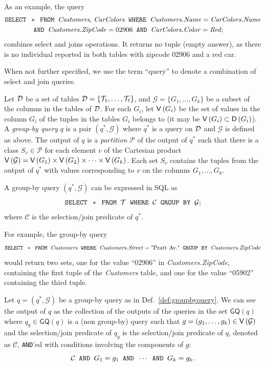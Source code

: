 As an example, the query 
\begin{align*}
\text{\texttt{SELECT }} &* \text{\texttt{ FROM }} \text{\emph{Customers},
\emph{CarColors}} \text{\texttt{ WHERE }} 
\text{\emph{Customers.Name}} = \text{\emph{CarColors.Name}} \\
& \text{\texttt{ AND }} \text{\emph{Customers.ZipCode}}=02906 \text{\texttt{ AND }}
\text{\emph{CarColors.Color}}=\text{\emph{Red}};
\end{align*}
combines select and joins operations. It returns no tuple (empty answer), as
there is no individual reported in both tables with zipcode $02906$ and a red
car.

When not further specified, we use the term ``query'' to denote a combination of
select and join queries.

\begin{definition}\label{def:groupbyquery}
  Let ${\cal D}$ be a set of tables ${\cal D}=\{{\cal T}_1,\dotsc,{\cal T}_\ell\}$, and
  $\mathcal{G}=\{G_1,\dotsc,G_k\}$ be a subset of the columns in the tables of ${\cal D}$. For
  each $G_i$, let $\mathsf{V}\left(G_i\right)$ be the set of values in the column
  $G_i$ of the tuples in the tables $G_i$ belongs to (it may be $\mathsf{V}\left(G_i\right)\subset
  \mathsf{D}\left(G_i\right)$). A \emph{group-by query} $q$ is a pair $(q^*,\mathcal{G})$ where $q^*$ is a query
  on ${\cal D}$ and $\mathcal{G}$ is defined as above.  The output of $q$ is a
  \emph{partition} $\mathcal{P}$ of the output of $q^*$ such that there is a
  class $S_v\in\mathcal{P}$ for each element $v$ of the Cartesian product
  $\mathsf{V}\left(\mathcal{G}\right)=\mathsf{V}\left(G_1\right)\times \mathsf{V}\left(G_2\right)\times\dotsb\times
  \mathsf{V}\left(G_k\right)$. Each set $S_v$ contains the tuples from the output of $q^*$
  with values corresponding to $v$ on the columns $G_1,\dotsc,G_k$.

  A group-by query $(q^*,\mathcal{G})$ can be expressed in SQL as
  \[
  \text{\texttt{SELECT }} * \text{\texttt{ FROM }} {\cal T} \text{\texttt{ WHERE }} \mathcal{C} \text{\texttt{ GROUP BY }} \mathcal{G};
   \]
  where $\mathcal{C}$ is the selection/join predicate of $q^*$.
\end{definition}
For example, the group-by query
\[
\text{\texttt{SELECT }} * \text{\texttt{ FROM }} \text{\emph{Customers}}  \text{\texttt{ WHERE }} \text{\emph{Customers.Street}} =
\text{"Pratt Av."} \text{\texttt{ GROUP BY }} \text{\emph{Customers.ZipCode}}
\]
would return two sets, one for the value ``02906'' in \emph{Customers.ZipCode},
containing the first tuple of the \emph{Customers}
table, and one for the value ``05902'' containing the third tuple.

\begin{fact}\label{fact:groupbyequiv}
  Let $q=(q^*,\mathcal{G})$ be a group-by query as in Def.~\ref{def:groupbyquery}. 
  We can see the output of $q$ as the collection of the outputs of the queries
  in the set $\mathsf{GQ}(q)$ where $q_g\in \mathsf{GQ}(q)$ is a (non group-by)
  query such that $g=(g_1,\dotsc,g_k)\in \mathsf{V}\left(\mathcal{G}\right)$ and the
  selection/join predicate of $q_g$ is the selection/join predicate of $q$,
  denoted as $\mathcal{C}$, \texttt{AND}'ed with conditions involving the
  components of $g$:
  \begin{equation}\label{eq:groupbyequiv}
    \mathcal{C} \text{\texttt{ AND }} G_1=g_1 \text{\texttt{ AND }} \dotsb \text{\texttt{ AND }} G_k=g_k.
  \end{equation}
\end{fact}

